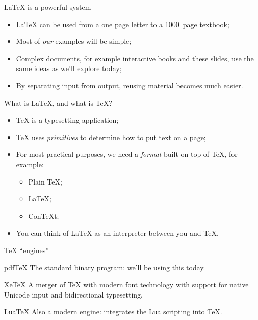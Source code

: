 \begin{frame}{\LaTeX{} is a powerful system}

  \begin{itemize}
    \item \LaTeX{} can be used from a one page letter to a 1000~page
      textbook;
    \item Most of \emph{our} examples will be simple;
    \item Complex documents, for example interactive books and
      these slides, use the same ideas as we'll explore today;
    \item By separating input from output, reusing material becomes 
      much easier.
  \end{itemize}
  
\end{frame}


\begin{frame}{What is \LaTeX{}, and what is \TeX{}?}

  \begin{itemize}
    \item \TeX{} is a typesetting application;
    \item \TeX{} uses \emph{primitives} to determine how to put text
      on a page;
    \item For most practical purposes, we need a \emph{format} built 
      on top of \TeX{}, for example:
      \begin{itemize}
        \item Plain \TeX{};
        \item \LaTeX{};
        \item Con\TeX{}t;
      \end{itemize}
    \item You can think of \LaTeX{} as an interpreter between you and
      \TeX{}.
  \end{itemize}

\end{frame}

\begin{frame}{\TeX{} \enquote{engines}}

  \begin{block}{pdf\TeX{}}
    The standard binary program: we'll be using this today.
  \end{block}
  
  \begin{block}{Xe\TeX{}}
    A merger of \TeX{} with modern font technology with support
    for native Unicode input and bidirectional typesetting.
  \end{block}
  
  \begin{block}{Lua\TeX{}}
    Also a modern engine: integrates the Lua scripting into \TeX{}.
  \end{block}
  
\end{frame}

